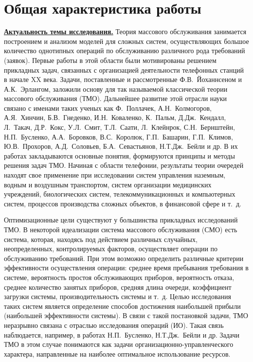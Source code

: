 \documentclass[14pt]{extarticle}
\newcommand{\actualityTXT}{Актуальность темы исследования.}
\theoremstyle{theorem}
\theoremstyle{remark}
\begin{document}
\setcounter{page}{3}
\section*{Общая характеристика работы}


\underline{\textbf{\actualityTXT}} Теория массового обслуживания занимается построением и анализом моделей для сложных систем, осуществляющих большое количество однотипных операций по обслуживанию различного рода требований (заявок). Первые работы в этой области были мотивированы решением прикладных задач, связанных с организацией деятельности телефонных станций в начале XX века. Задачи, поставленные и рассмотренные Ф.В.~Йоханнсеном и А.К.~Эрлангом, заложили основу для так называемой классической теории массового обслуживания (ТМО). Дальнейшее развитие этой отрасли науки связано с именами таких ученых как Ф.~Поллачек, А.Н.~Колмогоров, А.Я.~Хинчин, Б.В.~Гнеденко, И.Н.~Коваленко, К.~Пальм, Д.Дж.~Кендалл, Л.~Такач, Д.Р.~Кокс, У.Л.~Смит, Т.Л.~Саати, Л.~Клейнрок, С.Н.~Бернштейн, Н.П.~Бусленко, А.А.~Боровков, В.С.~Королюк, Г.П.~Башарин, Г.П.~Климов, Ю.В.~Прохоров, А.Д.~Соловьев,  Б.А.~Севастьянов, Н.Т.Дж.~Бейли и др. В их работах закладываются основные понятия, формируются принципы и методы решения задач ТМО. Начиная с области телефонии, результаты теории очередей находят свое применение при исследовании систем управления наземным, водным и воздушным транспортом, систем организации медицинских учреждений, биологических систем, телекоммуникационных и компьютерных систем, процессов производства сложных объектов, в финансовой сфере и т.~д.

Оптимизационные цели существуют у большинства прикладных исследований ТМО. В некоторой идеализации система массового обслуживания (СМО) есть система, которая, находясь под действием различных случайных, неопределенных, контролируемых факторов, осуществляет операции по обслуживанию требований. При этом возможно определить различные критерии эффективности осуществления операции: среднее время пребывания требования в системе, вероятность простоя обслуживающих приборов, вероятность отказа, среднее количество занятых приборов, средняя длина очереди, коэффициент загрузки системы, производительность системы и т.~д. Целью исследования таких систем является определение способов достижения наибольшей прибыли (наибольшей эффективности системы). В связи с такой постановкой задачи, ТМО неразрывно связана с отраслью исследования операций (ИО). Такая связь наблюдается, например, в работах Н.П.~Бусленко, Н.Т.Дж.~Бейли и др. Задачи ТМО в этом случае понимаются как задачи организационно-управленческого  характера, направленные на наиболее оптимальное использование ресурсов. 
\end{document}
